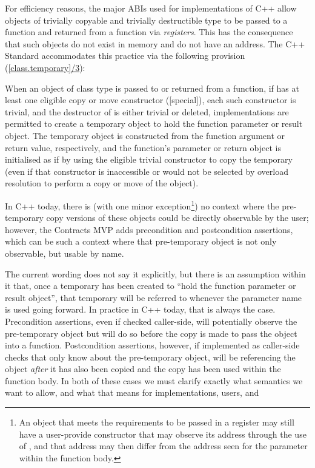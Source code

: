 For efficiency reasons, the major ABIs used for implementations of C++ allow objects of trivially copyable and trivially destructible type to be passed to a function and returned from a function via \emph{registers}. This has the consequence that such objects do not exist in memory and do not have an address. The C++ Standard accommodates this practice via the following provision (\href{https://timsong-cpp.github.io/cppwp/n4950/class.temporary#3}{[class.temporary]/3}):

\begin{adjustwidth}{0.5cm}{0.5cm}
When an object of class type  is passed to or returned from a function, if  has at least one eligible copy or move constructor ([special]), each such constructor is trivial, and the destructor of  is either trivial or deleted, implementations are permitted to create a temporary object to hold the function parameter or result object. The temporary object is constructed from the function argument or return value, respectively, and the function's parameter or return object is initialised as if by using the eligible trivial constructor to copy the temporary (even if that constructor is inaccessible or would not be selected by overload resolution to perform a copy or move of the object).
\end{adjustwidth}

In C++ today, there is (with one minor exception\footnote{An object that meets the requirements to be passed in a register may still have a user-provide constructor that may observe its address through the use of , and that address may then differ from the address seen for the parameter within the function body.}) no context where the pre-temporary copy versions of these objects could be directly observable by the user; however, the Contracts MVP \cite{P2900R10} adds precondition and postcondition assertions, which can be such a context where that pre-temporary object is not only observable, but usable by name.

The current wording does not say it explicitly, but there is an assumption within it that, once a temporary has been created to ``hold the function parameter or result object'', that temporary will be referred to whenever the parameter name is used going forward.   In practice in C++ today, that is always the case.    Precondition assertions, even if checked caller-side, will potentially observe the pre-temporary object but will do so before the copy is made to pass the object into a function.   Postcondition assertions, however, if implemented as caller-side checks that only know about the pre-temporary object, will be referencing the object \emph{after} it has also been copied and the copy has been used within the function body.
In both of these cases we must clarify exactly what semantics we want to allow, and what that means for implementations, users, and 

